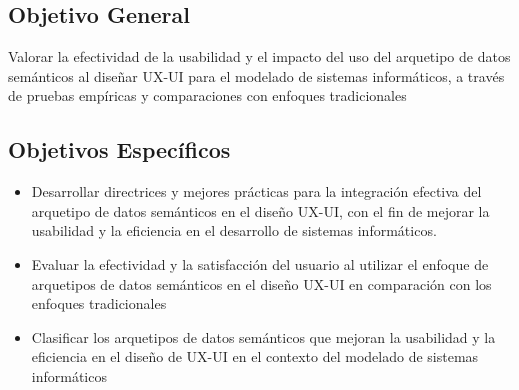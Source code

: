 \documentclass[12pt,a4paper]{article}
\begin{document}
\subsection{Objetivo General}
\label{sec:9}
Valorar la efectividad de la usabilidad y el impacto del uso del arquetipo de datos semánticos al diseñar UX-UI para el modelado de sistemas informáticos, a través de pruebas empíricas y comparaciones con enfoques tradicionales 

\subsection{Objetivos Específicos}
\label{sec:10}
\begin{itemize}
  \item 
  Desarrollar directrices y mejores prácticas para la integración efectiva del arquetipo de datos semánticos en el diseño UX-UI, con el fin de mejorar la usabilidad y la eficiencia en el desarrollo de sistemas informáticos.
  \item 
  Evaluar la efectividad y la satisfacción del usuario al utilizar el enfoque de arquetipos de datos semánticos en el diseño UX-UI en comparación con los enfoques tradicionales
  \item 
  Clasificar los arquetipos de datos semánticos que mejoran la usabilidad y la eficiencia en el diseño de UX-UI en el contexto del modelado de sistemas informáticos
\end{itemize}

\end{document}

